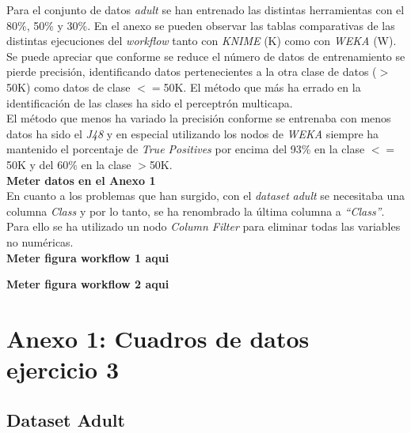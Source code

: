 \documentclass[10pt,a4paper]{article}
\begin{document}
Para el conjunto de datos \emph{adult} se han entrenado las distintas herramientas con el 80\%, 50\% y 30\%.
En el anexo se pueden observar las tablas comparativas de las distintas ejecuciones del \emph{workflow} tanto con \emph{KNIME} (K) como con \emph{WEKA} (W). Se puede apreciar que conforme se reduce el número de datos de entrenamiento se pierde precisión, identificando datos pertenecientes a la otra clase de datos ($>$50K) como datos de clase $<=$50K. El método que más ha errado en la identificación de las clases ha sido el perceptrón multicapa.\\
El método que menos ha variado la precisión conforme se entrenaba con menos datos ha sido el \emph{J48} y en especial utilizando los nodos de \emph{WEKA} siempre ha mantenido el porcentaje de \emph{True Positives} por encima del 93\% en la clase $<=$50K y del 60\% en la clase $>$50K.\\


{\Huge \textbf{Meter datos en el Anexo 1}}\\

En cuanto a los problemas que han surgido, con el \emph{dataset} \emph{adult} se necesitaba una columna \emph{Class} y por lo tanto, se ha renombrado la última columna a \emph{``Class''}. Para ello se ha utilizado un nodo \emph{Column Filter} para eliminar todas las variables no numéricas.\\


{\Huge \textbf{Meter figura workflow 1 aqui}}

{\Huge \textbf{Meter figura workflow 2 aqui}}

\newpage
\section{Anexo 1: Cuadros de datos ejercicio 3}

\subsection{Dataset Adult}
\end{document}
